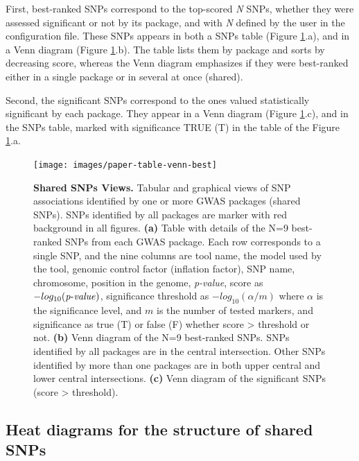\documentclass{article}
\begin{document}
First, best-ranked SNPs correspond to the top-scored \emph{N} SNPs, whether they were assessed significant or not by its package, and with\emph{
N} defined by the user in the configuration file. These SNPs appears in both a SNPs table (Figure \ref{fig:Table-Shared-SNPs}.a), and in
a Venn diagram (Figure \ref{fig:Table-Shared-SNPs}.b). The table lists them by package and sorts by decreasing score, whereas the Venn diagram emphasizes if they were best-ranked either in a single package or in several at once (shared). 

Second, the significant SNPs correspond to the ones valued statistically significant by each package. They appear in a Venn diagram (Figure \ref{fig:Table-Shared-SNPs}.c), and in the SNPs table, marked with significance TRUE (T) in the table of the Figure \ref{fig:Table-Shared-SNPs}.a.

\begin{figure}[H]
\begin{centering}
\texttt{[image: images/paper-table-venn-best]}
\par\end{centering}
\caption{\textbf{Shared SNPs Views. } Tabular and graphical views of SNP associations identified by one or more GWAS packages (shared SNPs). SNPs identified by all packages are marker with red background in all figures. \textbf{(a)} Table with details of the N=9 best-ranked SNPs from each GWAS package. Each row corresponds to a single SNP, and the nine columns are tool name,
the model used by the tool, genomic control factor (inflation factor), SNP name, chromosome, position in the genome, \emph{p-value}, score
as $-log_{10}({\operatorname{\mathit{p-value}}})$, significance threshold as $-log_{10}(\alpha/m)$ where $\alpha$ is the significance level, and $m$ is the number of
tested markers, and significance as true (T) or false (F) whether score > threshold or not. \textbf{(b)} Venn diagram of the N=9 best-ranked SNPs. SNPs identified by all packages are in the central intersection. Other SNPs identified by more than one packages are in both upper central and lower central intersections. \textbf{(c)} Venn diagram of the significant SNPs (score > threshold). \label{fig:Table-Shared-SNPs}}
\end{figure}

 
\subsection{Heat diagrams for the structure of shared SNPs}
\end{document}
